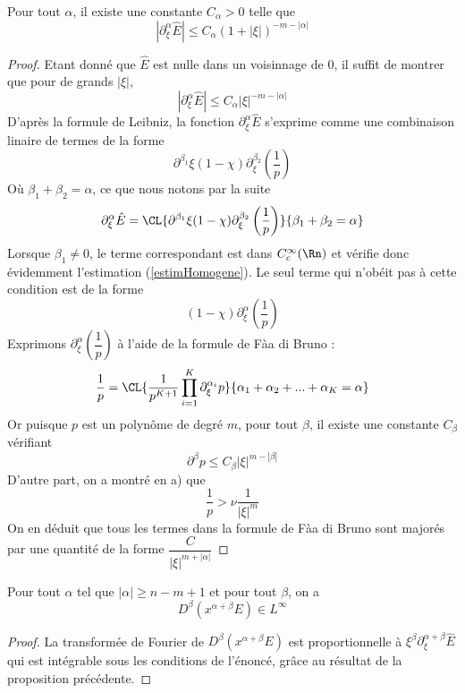 \documentclass[11pt,a4paper]{article}
\begin{document}
\begin{Prop} Pour tout $\alpha$, il existe une constante $C_\alpha > 0$ telle que  
\[ |\partial^\alpha_\xi \hat{E}| \leq C_\alpha \left(1 + |\xi|\right)^{-m-|\alpha|}\]
\begin{proof}
Etant donné que $\hat{E}$ est nulle dans un voisinnage de $0$, il suffit de montrer que pour de grands $|\xi|$, 
\begin{equation}
|\partial^\alpha_\xi \hat{E}| \leq C_\alpha |\xi|^{-m-|\alpha|}
\label{estimHomogene}
\end{equation}
D'après la formule de Leibniz, la fonction $\partial_{\xi}^\alpha \hat{E}$ s'exprime comme une combinaison linaire de termes de la forme 
\[\partial^{\beta_1}{\xi} (1 - \chi) \partial_{\xi}^{\beta_2} \left(\dfrac{1}{p}\right)\]
Où $\beta_1 + \beta_2 = \alpha$, ce que nous notons par la suite 
\[ \partial^\alpha_\xi \hat{E} = \CL{\partial^{\beta_1}{\xi} (1 - \chi) \partial_{\xi}^{\beta_2}\left(\dfrac{1}{p}\right)}{\beta_1 + \beta_2 = \alpha}\]
Lorsque $\beta_1 \neq 0$, le terme correspondant est dans $C^{\infty}_c(\Rn)$ et vérifie donc évidemment l'estimation (\ref{estimHomogene}). Le seul terme qui n'obéit pas à cette condition est de la forme 
\[ (1 - \chi) \partial_{\xi}^{\alpha} \left( \dfrac{1}{p}\right)\]
Exprimons $\partial_{\xi}^{\alpha} \left( \dfrac{1}{p}\right)$ à l'aide de la formule de Fàa di Bruno : 
\[ \dfrac{1}{p} = \CL{\dfrac{1}{p^{K+1}}\prod_{i=1}^K \partial^{\alpha_i}_{\xi}p}{\alpha_1 + \alpha_2 + ... + \alpha_K = \alpha}\]
Or puisque $p$ est un polynôme de degré $m$, pour tout $\beta$, il existe une constante $C_\beta$ vérifiant 
\[ \partial^{\beta} p \leq C_\beta |\xi|^{m-|\beta|} \]
D'autre part, on a montré en a) que \[\frac{1}{p} > \nu \dfrac{1}{|\xi|^m}\]
On en déduit que tous les termes dans la formule de Fàa di Bruno sont majorés par une quantité de la forme $\dfrac{C}{|\xi|^{m + |\alpha|}}$
\end{proof}
\end{Prop} 
\begin{Cor} Pour tout $\alpha$ tel que $|\alpha|\geq n - m + 1$ et pour tout $\beta$, on a 
\[ D^{\beta}(x^{\alpha+\beta} E) \in L^{\infty}\]
\begin{proof}
La transformée de Fourier de $D^{\beta}(x^{\alpha+\beta} E)$ est proportionnelle à $\xi^{\beta} \partial^{\alpha+\beta}_\xi\hat{E}$ qui est intégrable sous les conditions de l'énoncé, grâce au résultat de la proposition précédente. 
\end{proof}
\end{Cor}
\end{document}
